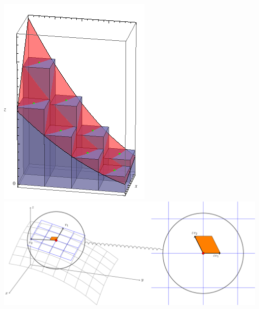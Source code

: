 \documentclass[20pt,margin=1in,innermargin=-4.5in,blockverticalspace=-0.25in]{tikzposter}
\begin{document}
\begin{columns}
{\begin{itemize}
\begin{center}
                \includegraphics[scale=0.6]{riemannint.png} \qquad \qquad \qquad  
                \includegraphics[scale=0.5]{tangentareaelement.png}
            \end{center}




\end{itemize}}
\end{columns}
\end{document}
